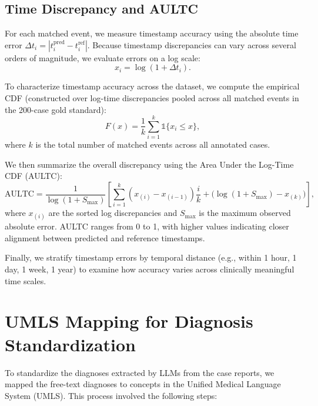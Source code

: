 \subsection{Time Discrepancy and AULTC}
\label{apd:aultc}

For each matched event, we measure timestamp accuracy using the absolute time error
$\Delta t_i = |t^{\text{pred}}_i - t^{\text{ref}}_i|$.  
Because timestamp discrepancies can vary across several orders of magnitude, we evaluate
errors on a log scale:
\[
x_i = \log(1 + \Delta t_i).
\]

To characterize timestamp accuracy across the dataset, we compute the empirical CDF (constructed over log-time discrepancies pooled across all matched events in the 200-case gold standard):
\[
F(x) = \frac{1}{k} \sum_{i=1}^{k} \mathds{1}\{x_i \le x\},
\]
where $k$ is the total number of matched events across all annotated cases.

We then summarize the overall discrepancy using the Area Under the Log-Time CDF (AULTC):
\[
\text{AULTC} =
\frac{1}{\log(1+S_{\max})}
\left[
\sum_{i=1}^{k}(x_{(i)} - x_{(i-1)})\frac{i}{k}
+
\big( \log(1+S_{\max}) - x_{(k)} \big)
\right],
\]
where $x_{(i)}$ are the sorted log discrepancies and $S_{\max}$ is the maximum observed
absolute error.  
AULTC ranges from 0 to 1, with higher values indicating closer alignment between predicted
and reference timestamps.

Finally, we stratify timestamp errors by temporal distance (e.g., within 1 hour, 1 day, 1 week,
1 year) to examine how accuracy varies across clinically meaningful time scales.





\section{UMLS Mapping for Diagnosis Standardization}
\label{apd:umls-mapping}

To standardize the diagnoses extracted by LLMs from the case reports, we mapped the free-text diagnoses to concepts in the Unified Medical Language System (UMLS). 
This process involved the following steps:

